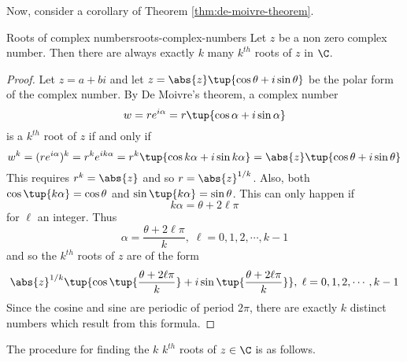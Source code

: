 Now, consider a corollary of Theorem \ref{thm:de-moivre-theorem}.

\begin{corollary}{Roots of complex numbers}{roots-complex-numbers}
Let $z$ be a non zero complex number.
Then there are always exactly $k$ many  $k^{th}$
roots of $z$ in $\C$.
\end{corollary}

\begin{proof}
Let $z=a+bi$ and let $z=\abs{z}\tup{\cos
\theta+i\sin \theta} $ be the polar form of the complex number. By De Moivre's
theorem, a complex number
\begin{equation*}
w= r e^{i \alpha} = r\tup{\cos \alpha +i\sin \alpha } 
\end{equation*}
is a $k^{th}$ root of $z$ if and only if
\begin{equation*}
w^k = (r e^{i \alpha})^k = r^k e^{ik\alpha} = r^{k}\tup{\cos k\alpha +i\sin k\alpha } =\abs{z}\tup{\cos \theta+i\sin \theta} 
\end{equation*}
This requires $r^{k}=\abs{z}$ and so $r=\abs{z}^{1/k}$. Also, both $\cos \tup{k\alpha } =\cos \theta$ and
$\sin \tup{k\alpha } =\sin \theta$. This can only happen if
\begin{equation*}
k\alpha =\theta+2 \ell \pi
\end{equation*}
for $\ell$ an integer. Thus
\begin{equation*}
\alpha =
\frac{\theta+2 \ell \pi }{k},\; \ell = 0, 1, 2, \cdots, k-1 
\end{equation*}
and so the $k^{th}$ roots of $z$ are of the form
\begin{equation*}
\abs{z}^{1/k}\tup{\cos \tup{\frac{\theta+2 \ell \pi }{k}}
+i\sin \tup{\frac{\theta+2 \ell \pi }{k}} } ,\;\ell = 0, 1, 2, \cdots, k-1 
\end{equation*}
Since the cosine and sine are periodic of period $2\pi $, there are exactly $
k$ distinct numbers which result from this formula. 
\end{proof}

The procedure for finding the $k$ $k^{th}$ roots of $z \in \C$ is as follows.

